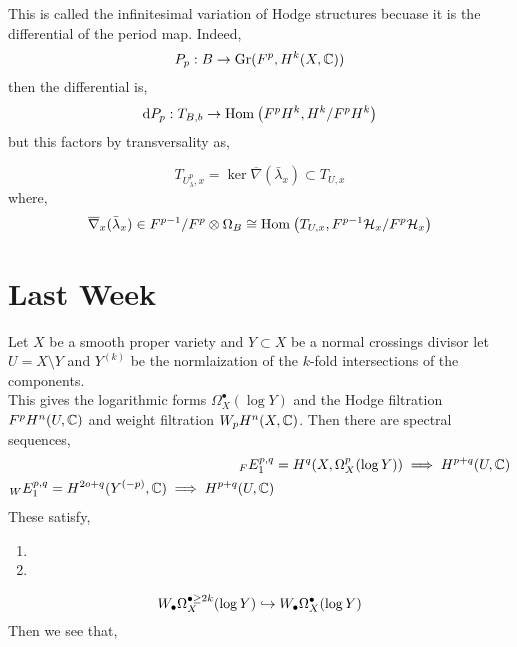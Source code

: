 \documentclass[12pt]{article}
\begin{document}
\begin{rmk}
This is called the infinitesimal variation of Hodge structures becuase it is the differential of the period map. Indeed,
\[ P_p : B \to \mathrm{Gr}(F^p, H^k(X, \mathbb{C})) \]
then the differential is,
\[ \mathrm{d}{P_p} : T_{B,b} \to \mathrm{Hom}_{} \left( F^p H^k, H^k / F^p H^k \right) \]
but this factors by transversality as,
\begin{center}
\end{center}
\end{rmk}

\begin{lemma}
\[ T_{U^p_\lambda, x} = \ker{\overline{\nabla}(\bar{\lambda}_x)} \subset T_{U, x} \]
where,
\[ \overline{\nabla}_x(\bar{\lambda}_x) \in F^{p-1} / F^p \otimes \Omega_B \cong \mathrm{Hom}_{} \left( T_{U,x}, F^{p-1} \mathcal{H}_x / F^p \mathcal{H}_x \right) \]
\end{lemma}

\section{Last Week} 

Let $X$ be a smooth proper variety and $Y \subset X$ be a normal crossings divisor let $U = X \setminus Y$ and $Y^{(k)}$ be the normlaization of the $k$-fold intersections of the components. 
\bigskip\\
This gives the logarithmic forms $\Omega^\bullet_X(\log{Y})$ and the Hodge filtration $F^p H^n(U, \mathbb{C})$ and weight filtration $W_p H^n(X, \mathbb{C})$. Then there are spectral sequences,
\begin{align*}
{}_F E^{p,q}_1 &= H^q(X, \Omega_X^p(\log{Y})) \implies H^{p+q}(U, \mathbb{C}) 
\\
{}_W E^{p,q}_1 = H^{2o+q}(Y^{(-p)}, \mathbb{C}) \implies H^{p+q}(U, \mathbb{C}) 
\end{align*}
These satisfy,
\begin{enumerate}
\item 
\item 
\end{enumerate}



\[ W_\bullet \Omega_X^{\bullet \ge 2k}(\log{Y}) \hookrightarrow W_\bullet \Omega_X^\bullet(\log{Y}) \]
Then we see that,
\begin{center}
\end{center}
\end{document}
